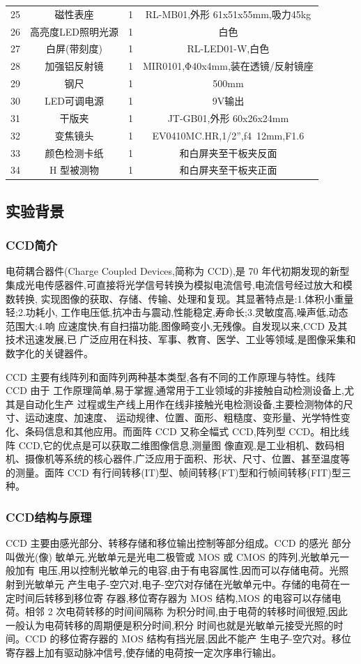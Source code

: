 \documentclass{ctexart}
\begin{document}
\begin{tabular}{c|c|c|c}
        25 & 磁性表座 &1&RL-MB01,外形 61x51x55mm,吸力45kg\\
        26&  高亮度LED照明光源 &1&白色\\
        27 &  白屏(带刻度) &1&RL-LED01-W,白色\\
        28 &  加强铝反射镜 &1&MIR0101,Φ40x4mm,装在透镜/反射镜座\\
        29 &  钢尺 &1& 500mm\\
        30& LED可调电源 &1&9V输出 \\
        31& 干版夹 &1& JT-GB01,外形 60x26x24mm\\
        32& 变焦镜头 &1& EV0410MC.HR,1/2”,f4~12mm,F1.6 \\
        33&颜色检测卡纸&1&和白屏夹至干板夹反面\\
        34&H 型被测物&1&和白屏夹至干板夹正面 \\
	\hline        
\end{tabular}
\subsection{实验背景}
\subsubsection{CCD简介}
电荷耦合器件(Charge Coupled Devices,简称为 CCD),是 70 年代初期发现的新型
集成光电传感器件,可直接将光学信号转换为模拟电流信号,电流信号经过放大和模数转换,
实现图像的获取、存储、传输、处理和复现。其显著特点是:1.体积小重量轻;2.功耗小,
工作电压低,抗冲击与震动,性能稳定,寿命长;3.灵敏度高,噪声低,动态范围大;4.响
应速度快,有自扫描功能,图像畸变小,无残像。自发现以来,CCD 及其技术迅速发展,已
广泛应用在科技、军事、教育、医学、工业等领域,是图像采集和数字化的关键器件。

CCD 主要有线阵列和面阵列两种基本类型,各有不同的工作原理与特性。线阵 CCD 由于
工作原理简单,易于掌握,通常用于工业领域的非接触自动检测设备上,尤其是自动化生产
过程或生产线上用作在线非接触光电检测设备,主要检测物体的尺寸、运动速度、加速度、
运动规律、位置、面形、粗糙度、变形量、光学特性变化、条码信息和其他应用。而面阵 CCD
又称全幅式 CCD,阵列型 CCD。相比线阵 CCD,它的优点是可以获取二维图像信息,测量图
像直观,是工业相机、数码相机、摄像机等系统的核心器件,广泛应用于面积、形状、尺寸、位置、甚至温度等的测量。面阵 CCD 有行间转移(IT)型、帧间转移(FT)型和行帧间转移(FIT)型三种。
\subsubsection{CCD结构与原理}
CCD 主要由感光部分、转移存储和移位输出控制等部分组成。CCD 的感光
部分叫做光(像) 敏单元,光敏单元是光电二极管或 MOS 或 CMOS 的阵列,光敏单元一般加有
电压,用以控制光敏单元的电容,由于有电容属性,因而可以存储电荷。光照射到光敏单元
产生电子-空穴对,电子-空穴对存储在光敏单元中。存储的电荷在一定时间后转移到移位寄
存器,移位寄存器为 MOS 结构,MOS 的电容可以存储电荷。相邻 2 次电荷转移的时间间隔称
为积分时间,由于电荷的转移时间很短,因此一般认为电荷转移的周期便是积分时间,积分
时间也就是光敏单元接受光照的时间。CCD 的移位寄存器的 MOS 结构有挡光层,因此不能产
生电子-空穴对。移位寄存器上加有驱动脉冲信号,使存储的电荷按一定次序串行输出。
\end{document}
